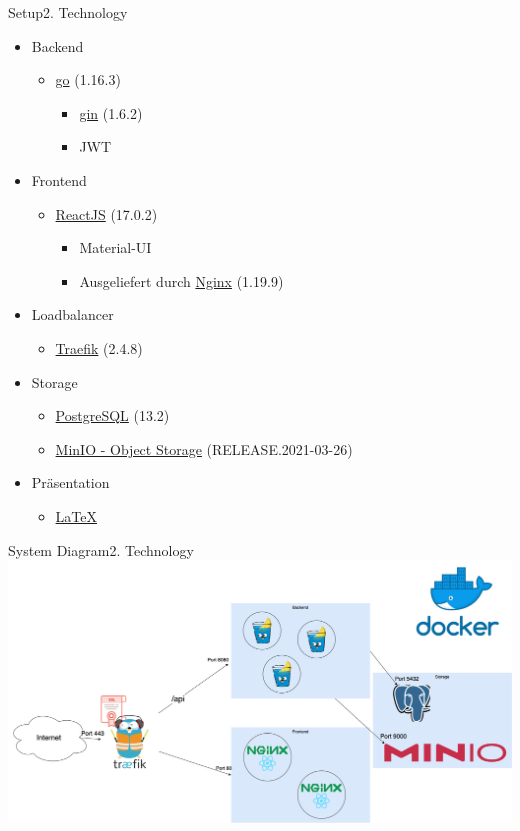 \documentclass[aspectratio=169,20pt]{beamer}
\begin{document}
\begin{frame}{Setup}{2. Technology}
	\begin{itemize}
		\item{Backend}
		\begin{itemize}
			\item{\href{https://golang.org/}{go} (1.16.3)}
			\begin{itemize}
				\item{\href{https://gin-gonic.com/}{gin} (1.6.2)}
				\item{JWT}
			\end{itemize}
		\end{itemize}
		\item{Frontend}
		\begin{itemize}
			\item{\href{https://reactjs.org/versions/}{ReactJS} (17.0.2)}
			\begin{itemize}
				\item{Material-UI}
				\item{Ausgeliefert durch \href{https://nginx.org/}{Nginx} (1.19.9)}
			\end{itemize}
		\end{itemize}
		\item{Loadbalancer}
		       
		\begin{itemize}
			\item{\href{https://traefik.io/}{Traefik} (2.4.8)}
		\end{itemize} 
		\item{Storage}
		\begin{itemize}
			\item{\href{https://www.postgresql.org/}{PostgreSQL} (13.2)}
			\item{\href{https://min.io/}{MinIO - Object Storage} (RELEASE.2021-03-26)}
		\end{itemize}
		\item{Präsentation}
		\begin{itemize}
			\item{\href{https://github.com/ost-fh/Latex-Beamer-Theme}{LaTeX}}
		\end{itemize}       
	\end{itemize}
		
\end{frame}




\begin{frame}{System Diagram}{2. Technology}
	\includegraphics[scale=0.45]{Infrastruktur}	
\end{frame}
\end{document}

